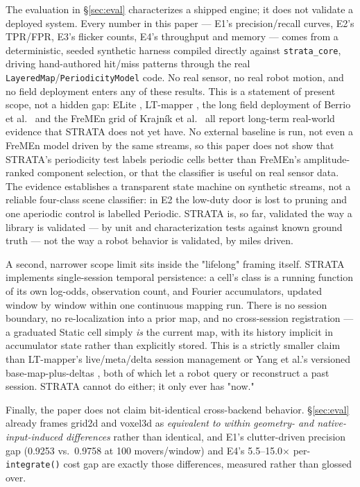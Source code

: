 \documentclass[conference]{IEEEtran}
\begin{document}
The evaluation in \S\ref{sec:eval} characterizes a shipped engine; it does not validate a
deployed system. Every number in this paper --- E1's precision/recall curves,
E2's TPR/FPR, E3's flicker counts, E4's throughput and memory --- comes from a
deterministic, seeded synthetic harness compiled directly against
\texttt{strata\_core}, driving hand-authored hit/miss patterns through the real
\texttt{LayeredMap}/\texttt{PeriodicityModel} code. No real sensor, no real robot motion,
and no field deployment enters any of these results. This is a statement of
present scope, not a hidden gap: ELite \cite{gil2025elite}, LT-mapper
\cite{kim2022ltmapper}, the long field deployment of Berrio et al.\
\cite{berrio2021longterm} and the FreMEn grid of Krajn\'ik et al.\
\cite{krajnik2016persistent} all report long-term real-world evidence that
STRATA does not yet have. No external baseline is run, not even a FreMEn model
driven by the same streams, so this paper does not show that STRATA's
periodicity test labels periodic cells better than FreMEn's amplitude-ranked
component selection, or that the classifier is useful on real sensor data.
The evidence establishes a transparent state machine on synthetic streams,
not a reliable four-class scene classifier: in E2 the low-duty door is lost to
pruning and one aperiodic control is labelled Periodic.
STRATA is, so far, validated the way a library is validated --- by unit and
characterization tests against known ground truth --- not the way a robot
behavior is validated, by miles driven.

A second, narrower scope limit sits inside the "lifelong" framing itself.
STRATA implements single-session temporal persistence: a cell's class is a
running function of its own log-odds, observation count, and Fourier
accumulators, updated window by window within one continuous mapping run.
There is no session boundary, no re-localization into a prior map, and no
cross-session registration --- a graduated Static cell simply \emph{is} the current
map, with its history implicit in accumulator state rather than explicitly
stored. This is a strictly smaller claim than LT-mapper's live/meta/delta
session management or Yang et al.'s versioned base-map-plus-deltas
\cite{yang2025lifelong3d}, both of which let a robot query or reconstruct a past
session. STRATA cannot do either; it only ever has "now."

Finally, the paper does not claim bit-identical cross-backend behavior.
\S\ref{sec:eval} already frames grid2d and voxel3d as \emph{equivalent to within
geometry- and native-input-induced differences} rather than identical, and E1's clutter-driven
precision gap (0.9253 vs.\ 0.9758 at 100 movers/window) and E4's 5.5--15.0$\times$
per-\texttt{integrate()} cost gap are exactly those differences, measured rather
than glossed over.
\end{document}
